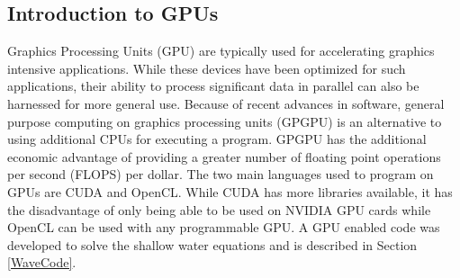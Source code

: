 \subsection{Introduction to GPUs}
\label{GPU}
Graphics Processing Units (GPU) are typically used for accelerating graphics intensive applications. While these devices have been optimized for such applications, their ability to process significant data in parallel can also be harnessed for more general use. Because of recent advances in software, general purpose computing on graphics processing units (GPGPU) is an alternative to using additional CPUs for executing a program. GPGPU has the additional economic advantage of providing a greater number of floating point operations per second (FLOPS) per dollar. The two main languages used to program on GPUs are CUDA and OpenCL. While CUDA has more libraries available, it has the disadvantage of only being able to be used on NVIDIA GPU cards while OpenCL can be used with any programmable GPU.  A GPU enabled code was developed to solve the shallow water equations and is described in Section \ref{WaveCode}.
